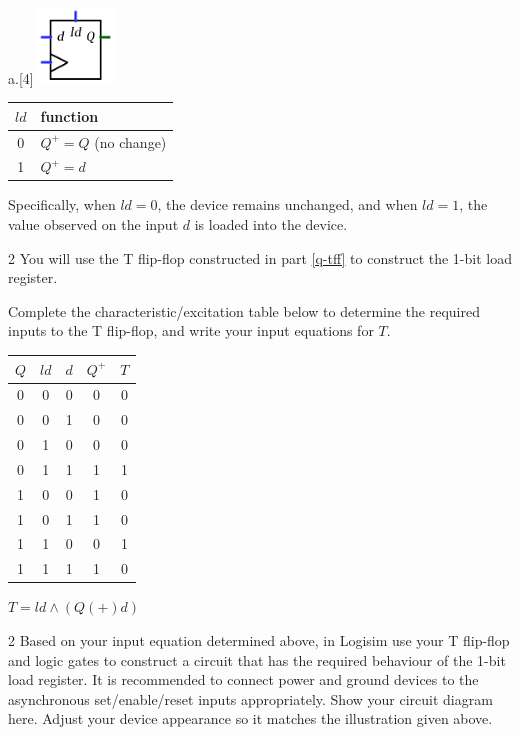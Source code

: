 \begin{question}{a.}[4]
\includegraphics[height=2.0cm]{images/load-1.png}

\begin{tabular}{c | l}
$ld$ & function \\
\hline
0 & $Q^{+}=Q$ (no change) \\
1 & $Q^{+}=d$ \\
\end{tabular}

Specifically, when $ld=0$, the device remains unchanged, and when $ld=1$, the value observed on the input $d$ is loaded into the device.

\item[2] You will use the T flip-flop constructed in part \ref{q-tff} to construct the 1-bit load register.

Complete the characteristic/excitation table below to determine the required inputs to the T flip-flop, and write your input equations for $T$.

{\color{NavyBlue}
\begin{tabular}{c c c | c | c}
$Q$ & $ld$ & $d$ & $Q^{+}$ & $T$ \\
\hline
0 & 0 & 0 & 0  & 0  \\
0 & 0 & 1 & 0  & 0  \\
0 & 1 & 0 & 0  & 0  \\
0 & 1 & 1 & 1  & 1  \\
\hline
1 & 0 & 0 & 1  & 0  \\
1 & 0 & 1 & 1  & 0  \\
1 & 1 & 0 & 0  & 1  \\
1 & 1 & 1 & 1  & 0  \\
\end{tabular}

$T = ld \land (Q (+) d)$
}

\item[2] \label{q-ld1} Based on your input equation determined above, in Logisim use your T flip-flop and logic gates to construct a circuit that has the required behaviour of the 1-bit load register. It is recommended to connect power and ground devices to the asynchronous set/enable/reset inputs appropriately. Show your circuit diagram here. Adjust your device appearance so it matches the illustration given above.


\end{question}
